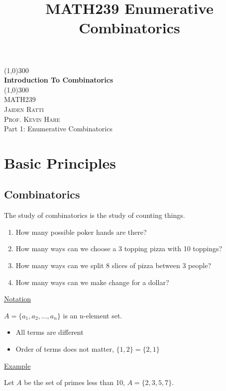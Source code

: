 \documentclass{article}
\title{MATH239 Enumerative Combinatorics}
\begin{document}
\begin{titlepage}
	\begin{center}
    \line(1,0){300}\\
    [0.65cm]
	\huge{\bfseries Introduction To Combinatorics}\\
	\line(1,0){300}\\
	\textsc{\Large MATH239}\\
	\textsc{\Large  Jaiden Ratti}\\
        \textsc{\Large Prof. Kevin Hare}\\
        \Large Part 1: Enumerative Combinatorics\\
	[5.5cm]
	\end{center}
\end{titlepage}




\tableofcontents

\pagebreak

\section{Basic Principles}

\subsection{Combinatorics}

The study of combinatorics is the study of counting things. 

\begin{enumerate}
    \item How many possible poker hands are there?
    \item How many ways can we choose a 3 topping pizza with 10 toppings?
    \item How many ways can we split 8 slices of pizza between 3 people?
    \item How many ways can we make change for a dollar?
\end{enumerate}

\underline{Notation}

$A = \{a_1, a_2, ..., a_n\}$ is an n-element set. 
\begin{itemize}
    \item All terms are different
    \item Order of terms does not matter, $\{1,2\} = \{2,1\}$
\end{itemize}

\underline{Example}

Let $A$ be the set of primes less than 10, $A = \{2,3,5,7\}$. 
\end{document}
